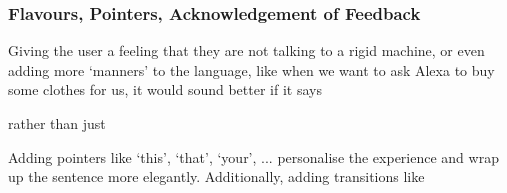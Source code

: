 \begin{flushright}
\end{flushright}





\subsubsection*{Flavours, Pointers, Acknowledgement of Feedback}
Giving the user a feeling that they are not talking to a rigid machine, or even adding more `manners' to the language, like when we want to ask Alexa to buy some clothes for us, it would sound better if it says 



\begin{flushright}
\end{flushright}


\noindent rather than just 


\begin{flushright}
\end{flushright}



\noindent Adding pointers like `this', `that', `your', ... personalise the experience and wrap up the sentence more elegantly. Additionally, adding transitions like 
\begin{flushright}
\end{flushright}



